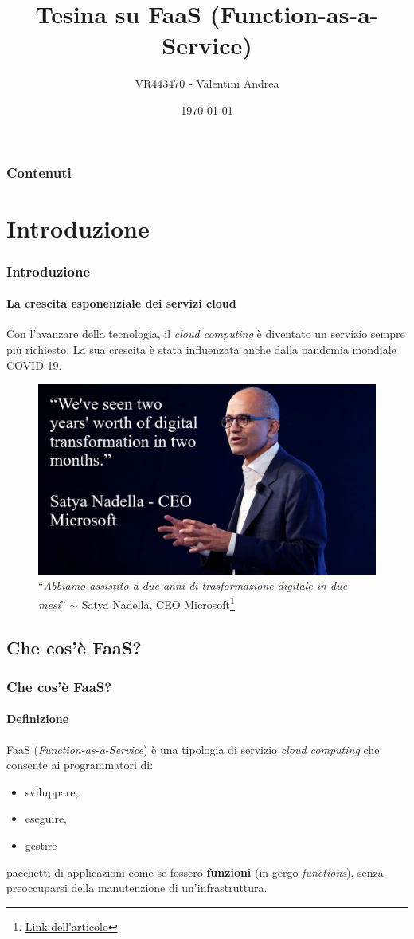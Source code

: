 \documentclass{beamer}
\title{Tesina su FaaS (Function-as-a-Service)}
\author{VR443470 - Valentini Andrea}
\institute{Università degli studi di Verona}
\date{\printdayoff\today}
\newcommand{\dquotes}[1]{``#1''}
\begin{document}
	
	\begin{frame}
		\titlepage
	\end{frame}
	
	\begin{frame}
		\frametitle{Contenuti}
		\tableofcontents
	\end{frame}
	
	\section{Introduzione}
	\begin{frame}
		\frametitle{Introduzione}
		\framesubtitle{La crescita esponenziale dei servizi cloud}
		Con l'avanzare della tecnologia, il \emph{cloud computing} è diventato un servizio sempre più richiesto. La sua crescita è stata influenzata anche dalla pandemia mondiale COVID-19.
		\begin{figure}
			\includegraphics[width=.7\textwidth]{img/satya-nadella-microsoft-mod.jpg}
			\caption*{\dquotes{\emph{Abbiamo assistito a due anni di trasformazione digitale in due mesi}}\newline
			$\sim$ Satya Nadella, CEO Microsoft\footnote{\href{https://www.microsoft.com/en-us/microsoft-365/blog/2020/04/30/2-years-digital-transformation-2-months/}{Link dell'articolo}}}
		\end{figure}
	\end{frame}
	
	\subsection{Che cos'è FaaS?}
	\begin{frame}
		\frametitle{Che cos'è FaaS?}
		\framesubtitle{Definizione}
		\alert{FaaS} (\emph{Function-as-a-Service}) è una tipologia di servizio \emph{cloud computing} che consente ai programmatori di:
		\begin{itemize}
			\item sviluppare,
			\item eseguire,
			\item gestire
		\end{itemize}
		pacchetti di applicazioni come se fossero \textbf{funzioni} (in gergo \emph{functions}), senza preoccuparsi della manutenzione di un'infrastruttura.
	\end{frame}
	
\end{document}
